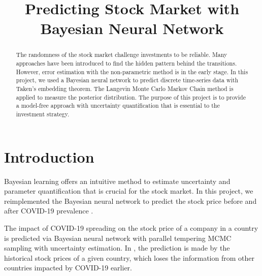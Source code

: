 \documentclass{article}
\title{Predicting Stock Market with Bayesian Neural Network}
\begin{document}
\maketitle


\begin{abstract}
The randomness of the stock market challenge investments to be reliable. Many approaches have been introduced to find the hidden pattern behind the transitions. However, error estimation with the non-parametric method is in the early stage. In this project, we used a Bayesian neural network to predict discrete  time-series data with Taken's embedding theorem. The Langevin Monte Carlo Markov Chain method is applied to measure the posterior distribution. The purpose of this project is to provide a model-free approach with uncertainty quantification that is essential to the investment strategy. 
\end{abstract}

\section{Introduction}





Bayesian learning offers an intuitive method to estimate uncertainty and parameter quantification that is crucial for the stock market.  In this project, we reimplemented the Bayesian neural network to predict the stock price before and after COVID-19 prevalence \citep{chandra2021bayesian}. 




The impact of COVID-19 spreading on the stock price of a company in a country is predicted via Bayesian neural network with parallel tempering MCMC sampling\citep{chandra2021bayesian, chandra2019langevin} with uncertainty estimation. In \cite{chandra2021bayesian}, the prediction is made by the historical stock prices of a given country, which loses the information from other countries impacted by COVID-19 earlier. 
\end{document}
